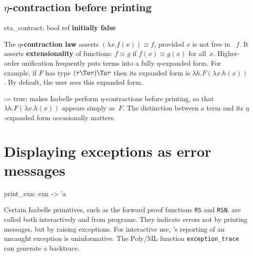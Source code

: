 \subsection{$\eta$-contraction before printing}
\begin{ttbox} 
eta_contract: bool ref \hfill{\bf initially false}
\end{ttbox}
The {\bf $\eta$-contraction law} asserts $(\lambda x.f(x))\equiv f$,
provided $x$ is not free in ~$f$.  It asserts {\bf extensionality} of
functions: $f\equiv g$ if $f(x)\equiv g(x)$ for all~$x$.  Higher-order
unification frequently puts terms into a fully $\eta$-expanded form.  For
example, if $F$ has type $(\tau\To\tau)\To\tau$ then its expanded form is
$\lambda h.F(\lambda x.h(x))$.  By default, the user sees this expanded
form.

\begin{ttdescription}
\item[\ttindexbold{eta_contract} := true;]
makes Isabelle perform $\eta$-contractions before printing, so that
$\lambda h.F(\lambda x.h(x))$ appears simply as~$F$.  The
distinction between a term and its $\eta$-expanded form occasionally
matters.
\end{ttdescription}


\section{Displaying exceptions as error messages}
\begin{ttbox} 
print_exn: exn -> 'a
\end{ttbox}
Certain Isabelle primitives, such as the forward proof functions {\tt RS}
and {\tt RSN}, are called both interactively and from programs.  They
indicate errors not by printing messages, but by raising exceptions.  For
interactive use, \ML's reporting of an uncaught exception is 
uninformative.  The Poly/ML function {\tt exception_trace} can generate a
backtrace.

